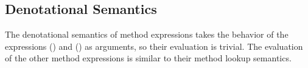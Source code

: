 \begin{AgdaAlign}
\subsection{Denotational Semantics}

The denotational semantics of method expressions takes the behavior of the 
expressions  ()
and  () as arguments, so their evaluation is trivial.
The evaluation of the other method expressions is similar to their method lookup semantics.
%
\begin{code}%
%
\>[2]\AgdaSpace{}%
\AgdaSymbol{:}\AgdaSpace{}%
\AgdaSpace{}%
\AgdaSpace{}%
\AgdaSpace{}%
\AgdaSpace{}%
\AgdaSpace{}%
\AgdaSpace{}%
\AgdaSpace{}%
\AgdaSpace{}%
\AgdaSpace{}%
\AgdaSpace{}%
\AgdaSpace{}%
\AgdaSpace{}%
\<%
\\
%
\>[2]\AgdaSpace{}%
%
\>[22]\AgdaSpace{}%
\AgdaSpace{}%
\AgdaSpace{}%
\AgdaSymbol{=}\AgdaSpace{}%
\AgdaSpace{}%
\AgdaSpace{}%
\AgdaSpace{}%
\AgdaSpace{}%
\AgdaSpace{}%
\AgdaSymbol{(}\AgdaSpace{}%
\AgdaSymbol{)}\<%
\\
%
\>[2]\AgdaSpace{}%
%
\>[22]\AgdaSpace{}%
\AgdaSpace{}%
\AgdaSpace{}%
\AgdaSymbol{=}\AgdaSpace{}%
\AgdaSpace{}%
\AgdaSpace{}%
\AgdaSpace{}%
\AgdaSpace{}%
\AgdaSpace{}%
\AgdaSymbol{(}\AgdaSpace{}%
\AgdaSpace{}%
\AgdaSymbol{)}\<%
\\
%
\>[2]\AgdaSpace{}%
%
\>[22]\AgdaSpace{}%
\AgdaSpace{}%
\AgdaSpace{}%
\AgdaSymbol{=}\AgdaSpace{}%
\AgdaSpace{}%
\AgdaSpace{}%
\AgdaSpace{}%
\AgdaSpace{}%

\end{code}
\end{AgdaAlign}
